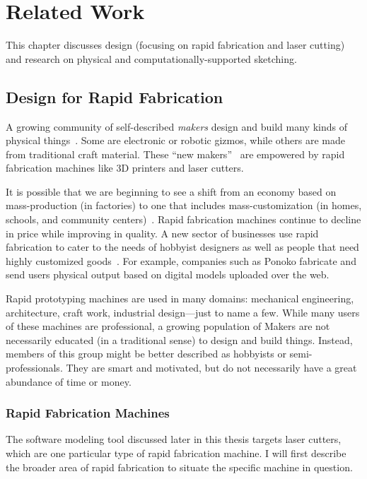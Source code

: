 \chapter{Related Work}
\label{sec:rw}

This chapter discusses design (focusing on rapid fabrication and laser
cutting) and research on physical and computationally-supported
sketching.

\section{Design for Rapid Fabrication}

A growing community of self-described \textit{makers} design and build
many kinds of physical things~\cite{gershenfeld-fab}. Some are
electronic or robotic gizmos, while others are made from traditional
craft material. These ``new makers''~\cite{gross-new-makers} are
empowered by rapid fabrication machines like 3D printers and laser
cutters.

It is possible that we are beginning to see a shift from an economy
based on mass-production (in factories) to one that includes
mass-customization (in homes, schools, and community
centers)~\cite{economist-fab}. Rapid fabrication machines continue to
decline in price while improving in quality. A new sector of
businesses use rapid fabrication to cater to the needs of hobbyist
designers as well as people that need highly customized
goods~\cite{paulos-citizenscience}. For example, companies such as
Ponoko fabricate and send users physical output based on digital
models uploaded over the web.

Rapid prototyping machines are used in many domains: mechanical
engineering, architecture, craft work, industrial design---just to
name a few. While many users of these machines are professional, a
growing population of Makers are not necessarily educated (in a
traditional sense) to design and build things. Instead, members of
this group might be better described as hobbyists or
semi-professionals. They are smart and motivated, but do not
necessarily have a great abundance of time or money.

\subsection{Rapid Fabrication Machines}

The software modeling tool discussed later in this thesis targets
laser cutters, which are one particular type of rapid fabrication
machine. I will first describe the broader area of rapid fabrication
to situate the specific machine in question.

